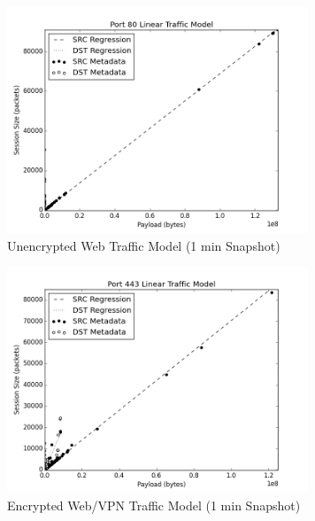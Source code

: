 \begin{figure}[!htb]
	\centering
	\includegraphics[width=9cm]{paperplots/80.png}
	\caption{Unencrypted Web Traffic Model (1 min Snapshot)}
	\label{fig:80}
\end{figure}

\begin{figure}[!htb]
	\centering
	\includegraphics[width=9cm]{paperplots/443.png}
	\caption{Encrypted Web/VPN Traffic Model (1 min Snapshot)}
	\label{fig:443}
\end{figure}

